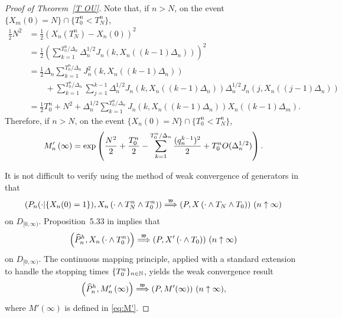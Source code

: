 \begin{proof}[Proof of Theorem~\ref{T OU}]
Note that, if $n>N$, on the event $\{X_{m}\left( 0\right) =N\}\cap
\{T_{0}^{n}<T_{N}^{n}\}$,
\begin{align*}
\frac{1}{2}N^{2}& =\frac{1}{2}\left( X_{n}\left( T_{N }^{n}\right)
-X_{n}\left( 0\right) \right) ^{2} \\
& =\frac{1}{2}\left( \sum_{k=1}^{T_{0 }^{n}/\Delta _{n}}\Delta
_{n}^{1/2}J_{n}\left( k,X_{n}\left( \left( k-1\right) \Delta _{n}\right)
\right) \right) ^{2} \\
& =\frac{1}{2}\Delta _{n}\sum_{k=1}^{T_{0 }^{n}/\Delta
_{n}}J_{n}^{2}\left( k,X_{n}\left( \left( k-1\right) \Delta _{n}\right)
\right)  \\
& \qquad +\sum_{k=1}^{T_{0 }^{n}/\Delta _{n}}\sum_{j=1}^{k-1}\Delta
_{n}^{1/2}J_{n}\left( k,X_{n}\left( \left( k-1\right) \Delta _{n}\right)
\right) \Delta _{n}^{1/2}J_{n}\left( j,X_{n}\left( \left( j-1\right) \Delta
_{n}\right) \right)  \\
& =\frac{1}{2}T_{0 }^{n}+N^{2}+\Delta _{n}^{1/2}\sum_{k=1}^{T_{0
}^{n}/\Delta _{n}}J_{n}\left( k,X_{n}\left( \left( k-1\right) \Delta
_{n}\right) \right) X_{n}\left( \left( k-1\right) \Delta _{m}\right) .
\end{align*}%
Therefore, if $n>N$, on the event $\{X_{n}( 0) =N\}\cap
\{T_{0}^{n}<T_{N}^{n}\}$,
\begin{equation}
M_{n}^{\prime }\left( \infty \right) =\exp \left( \frac{N^{2}}{2}+\frac{%
T_{0}^{n}}{2}-\sum_{k=1}^{T_{0}^{n}/\Delta _{n}}\frac{(q_{n}^{k-1})^{2}}{2}%
+T_{0}^{n}O(\Delta _{n}^{1/2})\right) .  \label{Eq_Mprime}
\end{equation}

It is not difficult to verify using the method of weak convergence of
generators in \citet{EK_Markovian} that%
\begin{align} \label{eq:8}
\left(P_n(\cdot |\{X_n(0) = 1\}),X_{n}\left( \cdot \wedge T_{N}^{n}\wedge T_{0}^{n}\right) \right)\overset{%
\mathfrak{w}}{\Longrightarrow }(P,X\left( \cdot \wedge T_{N}\wedge
T_{0}\right) )  \text{ } (n \uparrow \infty)
\end{align}%
on $D_{[0,\infty)}$.
Proposition~5.33 in \citet{Pitman_1975} implies that
\begin{equation*}
\left(\widehat{P}^{h}_{n},X_{n}\left( \cdot \wedge T_{0}^{n}\right) \right)\overset{%
\mathfrak{w}}{\Longrightarrow }(P,X^{\prime }\left( \cdot \wedge
T_{0}\right) ) \text{ } (n \uparrow \infty)
\end{equation*}%
on $D_{[0,\infty)}$.
The continuous mapping
principle, applied with a standard extension to handle the stopping times $\{T_0^n\}_{n \in \mathbb{N}}$, yields the weak convergence result
\begin{equation*}
\left(\widehat{P}^{h}_{n},M_{n}^{\prime }\left( \infty \right) \right)\overset{%
\mathfrak{w}}{\Longrightarrow }(P,M^{\prime }( \infty ) ) \text{ } (n \uparrow \infty),
\end{equation*}%
where $M'(\infty)$ is defined in \eqref{eq:M'}.


\end{proof}
